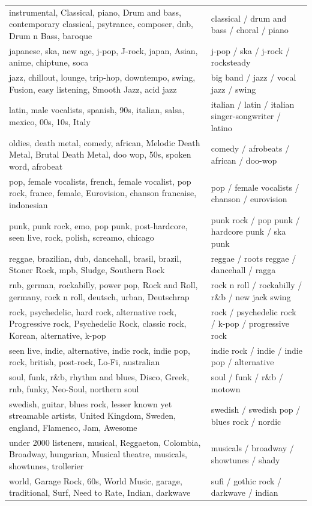 \begin{table}[t]
\begin{tabular*}{\linewidth}{@{\extracolsep{\fill}}>{\centering\arraybackslash}p{\dimexpr 262.50pt -2\tabcolsep-1.5\arrayrulewidth}>{\raggedright\arraybackslash}p{\dimexpr 225.00pt -2\tabcolsep-1.5\arrayrulewidth}}
instrumental, Classical, piano, Drum and bass, contemporary classical, psytrance, composer, dnb, Drum n Bass, baroque & classical / drum and bass / choral / piano \\ 
japanese, ska, new age, j-pop, J-rock, japan, Asian, anime, chiptune, soca & j-pop / ska / j-rock / rocksteady \\ 
jazz, chillout, lounge, trip-hop, downtempo, swing, Fusion, easy listening, Smooth Jazz, acid jazz & big band / jazz / vocal jazz / swing \\ 
latin, male vocalists, spanish, 90s, italian, salsa, mexico, 00s, 10s, Italy & italian / latin / italian singer-songwriter / latino \\ 
oldies, death metal, comedy, african, Melodic Death Metal, Brutal Death Metal, doo wop, 50s, spoken word, afrobeat & comedy / afrobeats / african / doo-wop \\ 
pop, female vocalists, french, female vocalist, pop rock, france, female, Eurovision, chanson francaise, indonesian & pop / female vocalists / chanson / eurovision \\ 
punk, punk rock, emo, pop punk, post-hardcore, seen live, rock, polish, screamo, chicago & punk rock / pop punk / hardcore punk / ska punk \\ 
reggae, brazilian, dub, dancehall, brasil, brazil, Stoner Rock, mpb, Sludge, Southern Rock & reggae / roots reggae / dancehall / ragga \\ 
rnb, german, rockabilly, power pop, Rock and Roll, germany, rock n roll, deutsch, urban, Deutschrap & rock n roll / rockabilly / r\&b / new jack swing \\ 
rock, psychedelic, hard rock, alternative rock, Progressive rock, Psychedelic Rock, classic rock, Korean, alternative, k-pop & rock / psychedelic rock / k-pop / progressive rock \\ 
seen live, indie, alternative, indie rock, indie pop, rock, british, post-rock, Lo-Fi, australian & indie rock / indie / indie pop / alternative \\ 
soul, funk, r\&b, rhythm and blues, Disco, Greek, rnb, funky, Neo-Soul, northern soul & soul / funk / r\&b / motown \\ 
swedish, guitar, blues rock, lesser known yet streamable artists, United Kingdom, Sweden, england, Flamenco, Jam, Awesome & swedish / swedish pop / blues rock / nordic \\ 
under 2000 listeners, musical, Reggaeton, Colombia, Broadway, hungarian, Musical theatre, musicals, showtunes, trollerier & musicals / broadway / showtunes / shady \\ 
world, Garage Rock, 60s, World Music, garage, traditional, Surf, Need to Rate, Indian, darkwave & sufi / gothic rock / darkwave / indian \\ 
\bottomrule
\end{tabular*}
\end{table}

